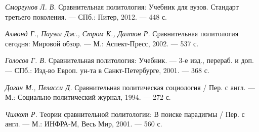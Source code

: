 \textit{Сморгунов Л. В.} Сравнительная политология: Учебник для вузов. Стандарт третьего поколения. --- СПб.: Питер, 2012. --- 448 с.

\textit{Алмонд Г., Пауэлл Дж., Стром К., Далтон Р.} Сравнительная политология сегодня: Мировой обзор. --- М.: Аспект-Пресс, 2002. --- 537 с.

\textit{Голосов Г. В.} Сравнительная политология: Учебник. --- 3-е изд., перераб. и доп. --- СПб.: Изд-во Европ. ун-та в Санкт-Петербурге, 2001. --- 368 с.

\textit{Доган М., Пеласси Д.} Сравнительная политическая социология / Пер. с англ. --- М.: Социально-политический журнал, 1994. --- 272 с.

\textit{Чилкот Р.} Теории сравнительной политологии: В поиске парадигмы / Пер. с англ. --- М.: ИНФРА-М, Весь Мир, 2001. --- 560 с.

